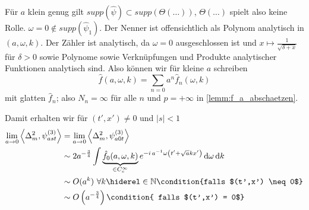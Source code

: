 Für $a$ klein genug gilt \(supp(\hat\psi) \subset supp(\Theta(\dots))\),
\(\Theta(\dots)\) spielt also keine Rolle. \(\omega = 0 \notin supp(\hat\psi_1)\). Der Nenner ist offensichtlich als Polynom analytisch in
\((a,\omega, k)\). Der Zähler ist analytisch, da \(\omega = 0\)
ausgeschlossen ist und \(x \mapsto \frac{1}{\sqrt{\delta + x}}\) für \(\delta > 0\) sowie Polynome sowie Verknüpfungen und Produkte analytischer Funktionen analytisch sind.
Also können wir für kleine $a$ schreiben
\begin{equation}
    \hat f(a,\omega, k) = \sum_{n=0} a^n \hat f_n (\omega,k)
    \label{eq:f(awk)}
\end{equation}
mit glatten $\hat f_n$; also \(N_n = \infty\) für alle \(n\) und \(p = + \infty\) in \cref{lemm:f_a_abschaetzen}.

Damit erhalten wir für \((t',x') \neq 0 \) und \(|s| < 1\)
\begin{align}
    \lim_{a\to 0} \left\langle \Delta_m^{2}, \psi_{ast}^{(3)} \right\rangle
    &=
    \lim_{a\to 0} \left\langle \Delta_m^{2}, \psi_{a0t}^{(3)}\right\rangle
    \nonumber \\ &\sim
    2 a^{-\frac{3}{4}}\int \underbrace{\hat f_0(a,\omega,k)}_{\in C^\infty_c}
    e^{-i \, a^{-1}\omega\left(t' + \sqrt{a} k x'\right)} \d \omega \d k
    \nonumber \\ &\sim
    O(a^k) ~\forall k \hiderel \in \mathbb{N} \condition{falls $(t',x') \neq 0$}
    \nonumber \\ &\sim
    O\left(a^{-\frac{3}{4}}\right) \condition{ falls $(t',x') = 0$}
\label{eq:delta_m2_s<1_t_neq_0}
\end{align}


